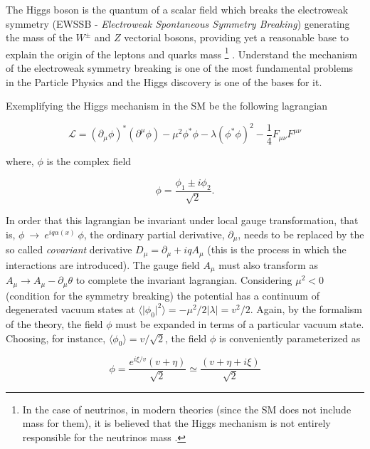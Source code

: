 The Higgs boson is the quantum of a scalar field which breaks the electroweak symmetry (EWSSB - \textit{Electroweak Spontaneous Symmetry Breaking}) generating the mass of the $W^{\pm}$ and $Z$ vectorial bosons, providing yet a reasonable base to explain the origin of the leptons and quarks mass \footnote{In the case of neutrinos, in modern theories (since the SM does not include mass for them), it is believed that the Higgs mechanism is not entirely responsible for the neutrinos mass \cite{bib:PhysRevD-86-1-2012}.} \cite{bib:JPhys-447-1-2013}. Understand the mechanism of the electroweak symmetry breaking is one of the most fundamental problems in the Particle Physics and the Higgs discovery is one of the bases for it. 

Exemplifying the Higgs mechanism in the SM be the following lagrangian

\begin{equation}
\mathcal{L} = (\partial_{\mu}\phi)^{*}(\partial^{\mu}\phi) - \mu^2 \phi^{*}\phi - \lambda(\phi^{*}\phi)^2 - \dfrac{1}{4}F_{\mu\nu}F^{\mu\nu}
\label{eq:Lagrangiana_U1}
\end{equation} 

where, $\phi$ is the complex field

\begin{equation}
\phi = \dfrac{\phi_1 \pm i\phi_2}{\sqrt{2}}.
\end{equation}

In order that this lagrangian be invariant under local gauge transformation, that is, $\phi~\rightarrow~e^{iq\alpha(x)}~\phi$, the ordinary partial derivative, $\partial_{\mu}$, needs to be replaced by the so called \textit{covariant} derivative $D_{\mu} = \partial_{\mu} + iqA_{\mu}$ (this is the process in which the interactions are introduced). The gauge field $A_{\mu}$ must also transform as $A_{\mu} \rightarrow A_{\mu} - \partial_{\mu}\theta$ to complete the invariant lagrangian. Considering $\mu^2 < 0$ (condition for the symmetry breaking) the potential has a continuum of degenerated vacuum states at $\langle \vert \phi_0 \vert^2 \rangle = -\mu^2/2\vert \lambda \vert = v^2/2$. Again, by the formalism of the theory, the field $\phi$ must be expanded in terms of a particular vacuum state. Choosing, for instance, $\langle \phi_0 \rangle = v/\sqrt{2}$, the field $\phi$ is conveniently parameterized as

\begin{equation}
\phi = \dfrac{e^{i\xi /v}(v + \eta)}{\sqrt{2}} \simeq \dfrac{(v + \eta + i\xi)}{\sqrt{2}}
\label{eq:phi_SSB}
\end{equation}


